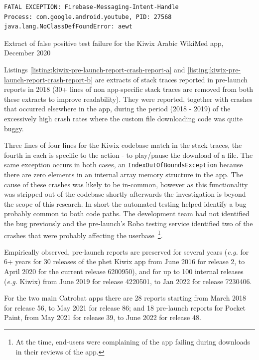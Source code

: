 \begin{listing}
\begin{verbatim}
FATAL EXCEPTION: Firebase-Messaging-Intent-Handle
Process: com.google.android.youtube, PID: 27568
java.lang.NoClassDefFoundError: aewt
\end{verbatim}
\caption{Extract of false positive test failure for the Kiwix Arabic WikiMed app, December 2020}
\label{listing:kiwix-wikimed-ar-pre-launch-report-crash}
\end{listing}

Listings \ref{listing:kiwix-pre-launch-report-crash-report-a} and \ref{listing:kiwix-pre-launch-report-crash-report-b} are extracts of stack traces reported in pre-launch reports in 2018 (30+ lines of non app-specific stack traces are removed from both these extracts to improve readability). They were reported, together with crashes that occurred elsewhere in the app, during the period (2018 - 2019) of the excessively high crash rates where the custom file downloading code was quite buggy. %

Three lines of four lines for the Kiwix codebase match in the stack traces, the fourth in each is specific to the action - to play/pause the download of a file. The same exception occurs in both cases, an \texttt{IndexOutOfBoundsException} because there are zero elements in an internal array memory structure in the app. The cause of these crashes was likely to be in-common, however as this functionality was stripped out of the codebase shortly afterwards the investigation is beyond the scope of this research. In short the automated testing helped identify a bug probably common to both code paths. The development team had not identified the bug previously and the pre-launch's Robo testing service identified two of the crashes that were probably affecting the userbase~\footnote{At the time, end-users were complaining of the app failing during downloads in their reviews of the app.}. 

Empirically observed, pre-launch reports are preserved for several years (\emph{e.g.} for 6+ years for 30 releases of the \gls{phet} Kiwix app from  June 2016 for release 2, to  April 2020 for the current release 6200950), and for up to 100 internal releases (\emph{e.g.} Kiwix) from  June 2019 for release 4220501, to  Jan 2022 for release 7230406. 

For the two main Catrobat apps there are 28 reports starting from  March 2018 for release 56, to  May 2021 for release 86; and 18 pre-launch reports for Pocket Paint, from  May 2021 for release 39, to  June 2022 for release 48.


